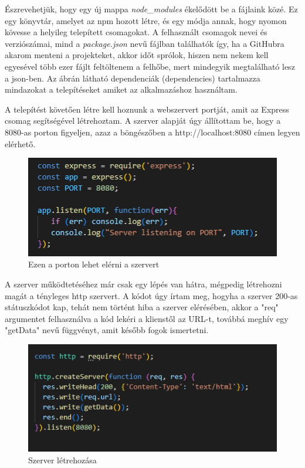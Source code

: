 Észrevehetjük, hogy egy új mappa \emph{node\_modules} ékelődött be a fájlaink közé. Ez egy könyvtár, amelyet az npm hozott létre, és egy módja annak, hogy nyomon kövesse a helyileg telepített csomagokat. A felhasznált csomagok nevei és verziószámai, mind a \emph{package.json} nevű fájlban találhatók így, ha a GitHubra akarom menteni a projekteket, akkor időt sprólok, hiszen nem nekem kell egyesével több ezer fájlt feltöltenem a felhőbe, mert mindegyik megtalálható lesz a json-ben. Az ábrán  látható dependenciák (dependencies) tartalmazza mindazokat a telepítéseket amiket az alkalmazáshoz használtam.

	A telepítést követően létre kell hoznunk a webszervert portját, amit az Express csomag segítségével létrehoztam. A szerver alapját úgy állítottam be, hogy a 8080-as porton figyeljen, azaz a böngészőben a http://localhost:8080 címen legyen elérhető.

\begin{figure}[h]
\centering
\includegraphics[scale=1]{images/serverPort.png}
\caption{Ezen a porton lehet elérni a szervert}
\end{figure}

A szerver működtetéséhez már csak egy lépés van hátra, mégpedig létrehozni magát a tényleges http szervert. A kódot úgy írtam meg, hogyha a szerver 200-as státuszkódot kap, tehát nem történt hiba a szerver elérésében, akkor a "req" argumentet felhasználva a kód lekéri a klienstől az URL-t, továbbá meghív egy "getData" nevű függvényt, amit később fogok ismertetni. \cite{nodeServer}

\begin{figure}[h]
\centering
\includegraphics[scale=1]{images/createServer.png}
\caption{Szerver létrehozása}
\end{figure}


